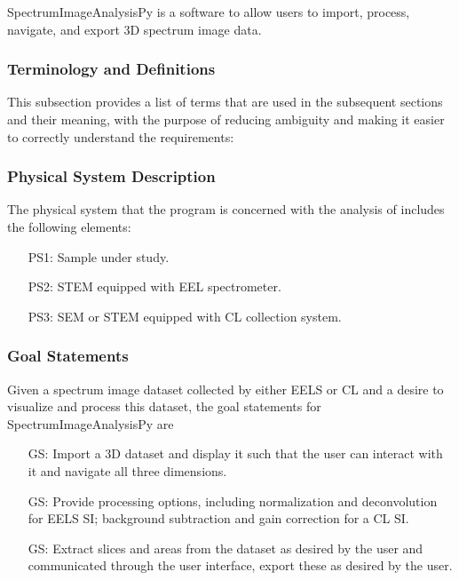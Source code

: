 \documentclass[12pt]{article}
\newcounter{goalnum} %
\newcommand{\progname}{SpectrumImageAnalysisPy} %
\begin{document}
\progname{} is a software to allow users to import, process, navigate, and
export 3D spectrum image data. 

\subsubsection{Terminology and  Definitions}

This subsection provides a list of terms that are used in the subsequent
sections and their meaning, with the purpose of reducing ambiguity and making it
easier to correctly understand the requirements:




\subsubsection{Physical System Description}

The physical system that the program is concerned with the analysis of includes
the following elements:

\begin{itemize}
	\item[PS1:] Sample under study.
	\item[PS2:] STEM equipped with EEL spectrometer.
	\item[PS3:] SEM or STEM equipped with CL collection system.
\end{itemize}

\subsubsection{Goal Statements}

\noindent Given a spectrum image dataset collected by either EELS or CL and a
desire to visualize and process this dataset, the goal statements for
\progname{} are

\begin{itemize}
	\item[GS\refstepcounter{goalnum}\thegoalnum \label{G_ImportDisplay}:] Import a
3D dataset and display it such that the user can interact with it and navigate
all three dimensions.
	\item[GS\refstepcounter{goalnum}\thegoalnum \label{G_Processing}:] Provide
processing options, including normalization and deconvolution for EELS SI;
background subtraction and gain correction for a CL SI.
	\item[GS\refstepcounter{goalnum}\thegoalnum \label{G_Extraction}:] Extract
slices and areas from the dataset as desired by the user and communicated
through the user interface, export these as desired by the user.
\end{itemize}
\end{document}
